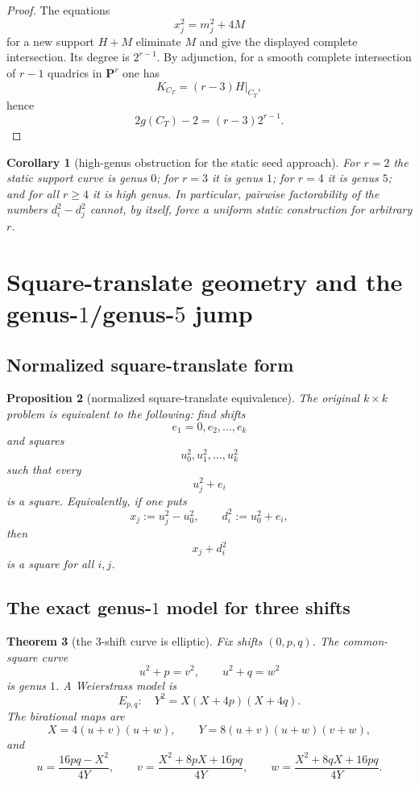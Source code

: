 \documentclass[11pt]{article}
\theoremstyle{plainbreak}
\newtheorem{theorem}{Theorem}[section]
\newtheorem{proposition}[theorem]{Proposition}
\newtheorem{corollary}[theorem]{Corollary}
\theoremstyle{defbreak}
\newcommand{\PP}{\mathbf{P}}
\begin{document}
\begin{proof}
The equations
\[
x_j^2=m_j^2+4M
\]
for a new support $H+M$ eliminate $M$ and give the displayed complete intersection.  Its degree is $2^{r-1}$.  By adjunction, for a smooth complete intersection of $r-1$ quadrics in $\PP^r$ one has
\[
K_{C_T}=(r-3)H|_{C_T},
\]
hence
\[
2g(C_T)-2=(r-3)2^{r-1}.
\]
\end{proof}

\begin{corollary}[high-genus obstruction for the static seed approach]
For $r=2$ the static support curve is genus $0$; for $r=3$ it is genus $1$; for $r=4$ it is genus $5$; and for all $r\ge 4$ it is high genus. In particular, pairwise factorability of the numbers $d_i^2-d_j^2$ cannot, by itself, force a uniform static construction for arbitrary $r$.
\end{corollary}

\section{Square-translate geometry and the genus-$1$/genus-$5$ jump}

\subsection{Normalized square-translate form}

\begin{proposition}[normalized square-translate equivalence]
The original $k\times k$ problem is equivalent to the following:
find shifts
\[
e_1=0,e_2,\dots,e_k
\]
and squares
\[
u_0^2,u_1^2,\dots,u_k^2
\]
such that every
\[
u_j^2+e_i
\]
is a square.  Equivalently, if one puts
\[
x_j:=u_j^2-u_0^2,\qquad d_i^2:=u_0^2+e_i,
\]
then
\[
x_j+d_i^2
\]
is a square for all $i,j$.
\end{proposition}

\subsection{The exact genus-$1$ model for three shifts}

\begin{theorem}[the $3$-shift curve is elliptic]
Fix shifts $(0,p,q)$. The common-square curve
\[
u^2+p=v^2,\qquad u^2+q=w^2
\]
is genus $1$.  A Weierstrass model is
\[
E_{p,q}:\quad Y^2=X(X+4p)(X+4q).
\]
The birational maps are
\[
X=4(u+v)(u+w),\qquad
Y=8(u+v)(u+w)(v+w),
\]
and
\[
u=\frac{16pq-X^2}{4Y},\qquad
v=\frac{X^2+8pX+16pq}{4Y},\qquad
w=\frac{X^2+8qX+16pq}{4Y}.
\]
\end{theorem}
\end{document}
